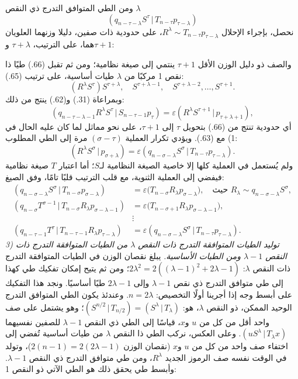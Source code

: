 \documentclass[11pt]{article}
\providecommand{\srcnumdisplay}[3][3.4em]{%
  \par\smallskip\noindent
  \babelsublr{\begin{minipage}[t]{#1}\vspace*{0pt}\srcLTR{#2}\end{minipage}%
  \begin{minipage}[t]{\dimexpr\linewidth-#1\relax}\vspace*{0pt}\centering
  \(\displaystyle #3\)\end{minipage}}\par\smallskip}
\newcommand{\srcLTR}[1]{\relax\ifmmode\text{\mbox{\babelsublr{\foreignlanguage{english}{#1}}}}\else\babelsublr{\foreignlanguage{english}{#1}}\fi}
\providecommand{\pair}[2]{(#1\,|\,#2)}
\providecommand{\eps}{\varepsilon}
\begin{document}
ومن الطي المتوافق التدرج ذي النقص $\lambda$
\[
 \pair{q_{n-\tau-\lambda}S^\tau}{T_{n-\tau}p_{\tau-\lambda}}
\]
نحصل، بإجراء الإحلال $R^\lambda\sim T_{n-\tau}p_{\tau-\lambda}$، على حدودية ذات صفين، دليلا وزنهما العلويان هما، على الترتيب، $\tau+\lambda$ و$\tau+1$:
\srcnumdisplay[4.2em]{(66.)}{%
 \pair{R^\lambda S^\tau}{p_{\tau+\lambda}}\pair{S^{\tau+1}}{p_{\tau+1}}.}
والصف ذو دليل الوزن الأقل $\tau+1$ ينتمي إلى صيغة نظامية؛ ومن ثم تقبل (66.) طيًا ذا نقص 1 مركبًا من $\lambda$ طيات أساسية، على ترتيب (65.):
\[
 (R^\lambda S^\tau)S^{\tau+\lambda},\quad S^{\tau+\lambda-1},\quad S^{\tau+\lambda-2},\ldots,S^{\tau+1}.
\]
وبمراعاة (31.) و(62.) ينتج من ذلك:
\[
 \pair{q_{n-\tau-\lambda-1}R^\lambda S^\tau}{S_{n-\tau-1}p_\tau}=\eps\pair{R^\lambda S^{\tau+1}}{p_{\tau+\lambda+1}},
\]
أي حدودية تنتج من (66.) بتحويل $\tau$ إلى $\tau+1$، على نحو مماثل لما كان عليه الحال في 1) مع (63.). ويؤدي تكرار العملية $(\sigma-\tau)$ مرة إلى الطي المطلوب:
\[
 \pair{R^\lambda S^\sigma}{p_{\sigma+\lambda}}=\eps\pair{q_{n-\sigma-\lambda}S^\sigma}{T_{n-\tau}p_{\tau-\lambda}}.
\]
ولم يُستعمل في العملية كلها إلا خاصية الصيغة النظامية لـ$S$؛ أما اعتبار $T$ صيغة نظامية فيفضي إلى العملية الثنوية، مع قلب الترتيب قلبًا تامًا، وفق الصيغ:
\begin{align*}
\pair{q_{n-\sigma-\lambda}S^\sigma}{T_{n-\sigma}p_{\sigma-\lambda}}&=\eps\bigl(T_{n-\sigma}R_\lambda p_{\sigma-\lambda}\bigr),\quad \text{حيث }R_\lambda\sim q_{n-\sigma-\lambda}S^\sigma,\\
\pair{q_{n-\sigma}T^{\sigma-1}}{T_{n-\sigma}R_\lambda p_{\sigma-\lambda-1}}&=\eps\bigl(T_{n-\sigma+1}R_\lambda p_{\sigma-\lambda-1}\bigr),\\
&\vdots\\
\pair{q_{n-\tau-1}T^\tau}{T_{n-\tau-1}R_\lambda p_{\tau-\lambda}}&=\eps\pair{q_{n-\sigma-\lambda}S^\sigma}{T_{n-\tau}p_{\tau-\lambda}}.
\end{align*}
\emph{3) توليد الطيات المتوافقة التدرج ذات النقص $\lambda$ من الطيات المتوافقة التدرج ذات النقص $\lambda-1$ ومن الطيات الأساسية.} يبلغ نقصان الوزن في الطيات المتوافقة التدرج ذات النقص $\lambda$: $2\lambda^2=2((\lambda-1)^2+2\lambda-1)$؛ ومن ثم يتيح إمكان تفكيك طي كهذا إلى طي متوافق التدرج ذي نقص $\lambda-1$ وإلى $2\lambda-1$ طيًا أساسيًا. ونجد هذا التفكيك على أبسط وجه إذا أجرينا أولًا التخصيص: $n=2\lambda$. وعندئذ يكون الطي المتوافق التدرج الوحيد الممكن، ذو النقص $\lambda$، هو: $\pair{S^{n/2}}{T_{n/2}}=\pair{S^\lambda}{T_\lambda}$؛ وهو يشتمل على صف واحد أقل من كل من $u$ و$x$، قياسًا إلى الطي ذي النقص $\lambda-1$ للصفين نفسيهما $\pair{uS^\lambda}{T_\lambda x}$. وعلى العكس، نركب الطي ذا النقص $\lambda$ من طيات أساسية تُفضي إلى اختفاء صف واحد من كل من $u$ و$x$ (نقصان الوزن $2(n-1)=2(2\lambda-1)$)، وتولد في الوقت نفسه صف الرموز الجديد $R^\lambda$، ومن طي متوافق التدرج ذي النقص $\lambda-1$. وأبسط طي يحقق ذلك هو الطي الآتي ذو النقص 1:
\end{document}
